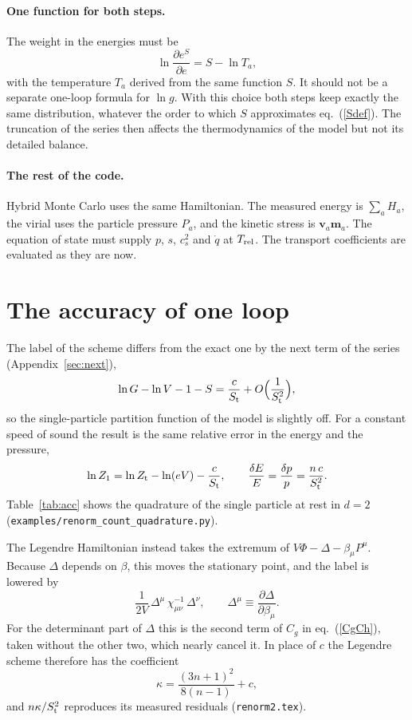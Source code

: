 \documentclass[11pt,aps,preprint,nofootinbib,superscriptaddress,tightenlines]{revtex4-2}
\def\st{\begin{equation}}
\def\stp{\end{equation}}
\def\Eq#1{eq.~(\ref{#1})}
\def\Tab#1{Table~\ref{#1}}
\def\App#1{Appendix~\ref{#1}}
\let\oldparagraph\paragraph
\renewcommand{\paragraph}{\par\bigskip\oldparagraph}
\begin{document}
\paragraph{One function for both steps.}  The weight in the energies must be
\st
\ln\frac{\partial e^{S}}{\partial e}=S-\ln T_a ,
\stp
with the temperature $T_a$ derived from the same function $S$.  It should not be a separate one-loop formula for $\ln g$.  With this choice both steps keep exactly the same
distribution, whatever the order to which $S$ approximates \Eq{Sdef}.  The truncation of the series then affects the thermodynamics of the model
but not its detailed balance.

\paragraph{The rest of the code.}  Hybrid Monte Carlo uses the same Hamiltonian.  The measured energy is $\sum_aH_a$, the virial uses the particle
pressure $P_a$, and the kinetic stress is $\bm v_a\bm m_a$.  The equation of state must supply $p$, $s$, $c_s^2$ and $\dot q$ at $T_{\rm rel}$.  The
transport coefficients are evaluated as they are now.

\section{The accuracy of one loop}
\label{sec:accuracy}

The label of the scheme differs from the exact one by the next term of the series (\App{sec:next}),
\st
\ln G-\ln V-1-S=\frac{c}{S_{\rm t}}+O\Big(\frac1{S_{\rm t}^2}\Big),
\stp
so the single-particle partition function of the model is slightly off.  For a constant speed of sound the result is the same relative error in
the energy and the pressure,
\st
\ln Z_1=\ln Z_{\rm t}-\ln(eV)-\frac c{S_{\rm t}},\qquad \frac{\delta E}E=\frac{\delta p}p=\frac{n\,c}{S_{\rm t}^2} .
\stp  \Tab{tab:acc} shows the quadrature of the single particle at rest in $d=2$
(\nolinkurl{examples/renorm_count_quadrature.py}).

The Legendre Hamiltonian instead takes the extremum of $V\Phi-\Delta-\beta_\mu P^\mu$.  Because $\Delta$ depends on $\beta$, this moves the
stationary point, and the label is lowered by
\st
\frac1{2V}\,\Delta^\mu\,\chi^{-1}_{\mu\nu}\,\Delta^\nu,\qquad \Delta^\mu\equiv\frac{\partial\Delta}{\partial\beta_\mu} .
\stp
For the determinant part of $\Delta$ this is the second term of $C_g$ in \Eq{CgCh}, taken without the other two, which nearly cancel it.  In place of $c$ the Legendre scheme
therefore has the coefficient
\st
\kappa=\frac{(3n+1)^2}{8(n-1)}+c ,
\stp
and $n\kappa/S_{\rm t}^2$ reproduces its measured residuals
(\nolinkurl{renorm2.tex}).
\end{document}
